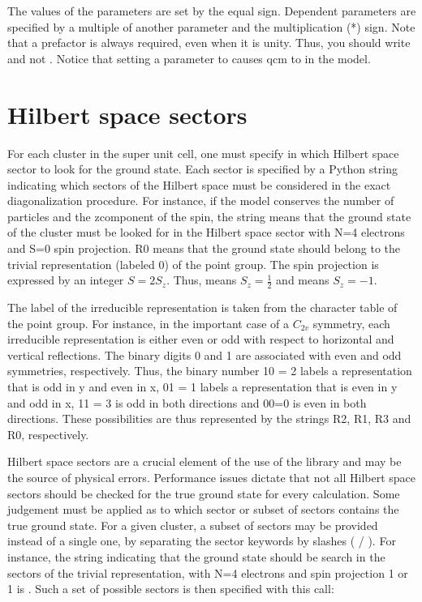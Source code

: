 \documentclass[letterpaper,10pt,english]{sphinxmanual}
\begin{document}
\sphinxAtStartPar
The values of the parameters are set by the equal sign. Dependent parameters are specified by a multiple of another parameter and the multiplication (*) sign. Note that a prefactor is always required, even when it is unity. Thus, you should write  and not .
Notice that setting a parameter to  causes qcm to  in the model.


\section{Hilbert space sectors}
\label{\detokenize{parameters:hilbert-space-sectors}}
\sphinxAtStartPar
For each cluster in the super unit cell, one must specify in which Hilbert space sector to look for the ground state.
Each sector is specified by a Python string indicating  which sectors of the Hilbert space must be considered in the exact diagonalization procedure. For instance, if the model conserves the number of particles and the z\sphinxhyphen{}component of the spin, the string  means that the ground state of the cluster must be looked for in the Hilbert space sector with N=4 electrons and S=0 spin projection. R0 means that the ground state should belong to the trivial representation (labeled 0) of the point group. The spin projection is expressed by an integer \(S = 2 S_z\). Thus,  means \(S_z=\frac12\) and  means \(S_z=-1\).

\sphinxAtStartPar
The label of the irreducible representation is taken from the character table of the point group. For instance, in the important case of a \(C_{2v}\) symmetry, each irreducible representation is either even or odd with respect to horizontal and vertical reflections. The binary digits 0 and 1 are associated with even and odd symmetries, respectively.
Thus, the binary number 10 = 2 labels a representation that is odd in y and even in x, 01 = 1 labels a representation that is even in y and odd in x, 11 = 3 is odd in both directions and 00=0 is even in both directions. These possibilities are thus represented by the strings R2, R1, R3 and R0, respectively.

\sphinxAtStartPar
Hilbert space sectors are a crucial element of the use of the library and may be the source of physical errors. Performance issues dictate that not all Hilbert space sectors should be checked for the true ground state for every calculation. Some judgement must be applied as to which sector or subset of sectors contains the true ground state. For a given cluster, a subset of sectors may be provided instead of a single one, by separating the sector keywords by slashes ( / ). For instance, the string indicating that the ground state should be search in the sectors of the trivial representation, with N=4 electrons and spin projection \sphinxhyphen{}1 or 1 is . Such a set of possible sectors is then specified with this call:
\end{document}

